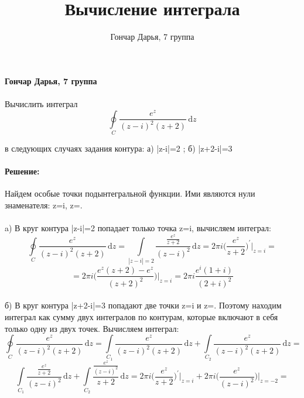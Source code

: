 \documentclass[12pt, a4paper]{article}
\title{Вычисление интеграла}
\author{Гончар Дарья, 7 группа }
\date{}
\begin{document}
\textbf{Гончар Дарья, 7 группа}
\paragraph{}
Вычислить интеграл  \begin{equation*}
\oint\limits_C \frac{e^z}{(z-i)^2(z+2)}\, \mathrm{d} z \end{equation*}

в следующих случаях задания контура: а) |z\big-i|=2 ;   б) |z+2\big-i|=3
\paragraph{Решение:}
Найдем особые точки подынтегральной функции. Ими являются нули знаменателя: z=i, z=.
\paragraph{}
a) В круг контура |z\big-i|=2 попадает только точка z=i, вычисляем интеграл:
\begin{equation*} \oint\limits_C \frac{e^z}{(z-i)^2(z+2)}\, \mathrm{d} z = \int\limits_{|z-i|=2} \frac{\frac{e^z}{z+2}}{(z-i)^2}\, \mathrm{d} z  = 2\pi i\Bigg(\frac{e^z}{z+2}\Bigg)^{'} \Bigg|_{z=i} = 
\end{equation*} 
\begin{equation*}
   = 2\pi i\Bigg(\frac{e^z(z+2)-e^z}{(z+2)^2}\Bigg)\Bigg|_{z=i} = 2\pi i\frac{e^i(1+i)}{(2+i)^2} 
\end{equation*}

\paragraph{}
б) В круг контура |z+2\big-i|=3 попадают две точки z=i и z=. Поэтому находим интеграл как сумму двух интегралов по контурам, которые включают в себя только одну из двух точек. Вычисляем интеграл:
\begin{equation*} \oint\limits_C \frac{e^z}{(z-i)^2(z+2)}\, \mathrm{d} z = \int\limits_{C_1} \frac{e^z}{(z-i)^2(z+2)}\, \mathrm{d} z + \int\limits_{C_2} \frac{e^z}{(z-i)^2(z+2)}\, \mathrm{d} z=\end{equation*}
\begin{equation*}
\int\limits_{C_1} \frac{\frac{e^z}{z+2}}{(z-i)^2}\, \mathrm{d} z  + \int\limits_{C_2} \frac{\frac{e^z}{(z-i)^2}}{z+2}\, \mathrm{d} z = 2\pi i\Bigg(\frac{e^z}{z+2}\Bigg)^{'} \Bigg|_{z=i} + 2\pi i\Bigg(\frac{e^z}{(z-i)^2}\Bigg) \Bigg|_{z=-2} = 
\end{equation*} 
\end{document}
